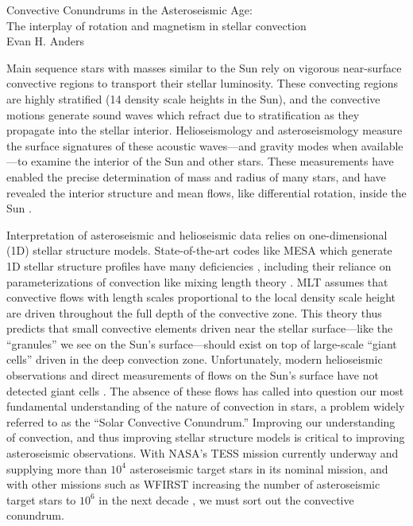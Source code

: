 \documentclass[preprint, hmargin=1in, vmargin=1in]{aastex62}
\begin{document}
\begin{center}
\Large{Convective Conundrums in the Asteroseismic Age:\\\vspace{-6pt}The interplay of rotation and magnetism in stellar convection} \\
\large{Evan H. Anders }
\end{center}
\vspace{-0.2cm}



Main sequence stars with masses similar to the Sun rely on vigorous near-surface convective regions to transport their stellar luminosity.
These convecting regions are highly stratified (14 density scale heights in the Sun), and the convective motions generate sound waves which refract due to stratification as they propagate into the stellar interior.
Helioseismology and asteroseismology measure the surface signatures of these acoustic waves---and gravity modes when available---to examine the interior of the Sun and other stars.
These measurements have enabled the precise determination of mass and radius of many stars, and have revealed the interior structure and mean flows, like differential rotation, inside the Sun \citep{huber&all2019, christensen-dalsgaard2002}.

Interpretation of asteroseismic and helioseismic data relies on one-dimensional (1D) stellar structure models. 
State-of-the-art codes like MESA \citep{paxton&all2011} which generate 1D stellar structure profiles have many deficiencies \citep{buldgen2019}, including their reliance on parameterizations of convection like mixing length theory \citep[MLT,][]{bohm-vitense1958}.
MLT assumes that convective flows with length scales proportional to the local density scale height are driven throughout the full depth of the convective zone.
This theory thus predicts that small convective elements driven near the stellar surface---like the ``granules'' we see on the Sun's surface---should exist on top of large-scale ``giant cells'' driven in the deep convection zone.
Unfortunately, modern helioseismic observations and direct measurements of flows on the Sun's surface have not detected giant cells \citep{hanasoge&all2015, hathaway&all2015}.
The absence of these flows has called into question our most fundamental understanding of the nature of convection in stars, a problem widely referred to as the ``Solar Convective Conundrum.''
Improving our understanding of convection, and thus improving stellar structure models is critical to improving asteroseismic observations.
With NASA's TESS mission currently underway and supplying more than $10^4$ asteroseismic target stars in its nominal mission, and with other missions such as WFIRST increasing the number of asteroseismic target stars to $10^6$ in the next decade \citep{huber&all2019}, we must sort out the convective conundrum.
\end{document}
